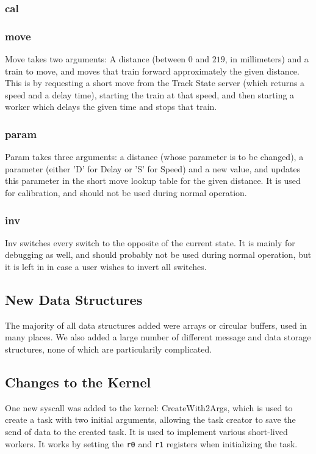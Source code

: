 \documentclass{article}
\begin{document}
\subsubsection{cal}

\subsubsection{move}
Move takes two arguments: A distance (between $0$ and $219$, in millimeters) and a train to move, and moves that train forward approximately the given distance. This is by requesting a short move from the Track State server (which returns a speed and a delay time), starting the train at that speed, and then starting a worker which delays the given time and stops that train.

\subsubsection{param}
Param takes three arguments: a distance (whose parameter is to be changed), a parameter (either 'D' for Delay or 'S' for Speed) and a new value, and updates this parameter in the short move lookup table for the given distance. It is used for calibration, and should not be used during normal operation.

\subsubsection{inv}
Inv switches every switch to the opposite of the current state. It is mainly for debugging as well, and should probably not be used during normal operation, but it is left in in case a user wishes to invert all switches.

\subsection{New Data Structures}
    The majority of all data structures added were arrays or circular buffers, used in many places. We also added a large number of different message and data storage structures, none of which are particularily complicated. 

\subsection{Changes to the Kernel}
    One new syscall was added to the kernel: CreateWith2Args, which is used to create a task with two initial arguments, allowing the task creator to save the send of data to the created task. It is used to implement various short-lived workers. It works by setting the \verb|r0| and \verb|r1| registers when initializing the task.
\end{document}

